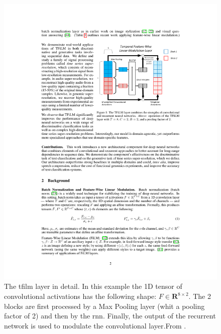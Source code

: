 \begin{figure}[H]                                   
	\begin{center}                                     
		\includegraphics[scale=1.5]{img/tfilm_layer.pdf}  
		\captionsetup{margin=2cm}                         
		\caption{The \gls{tfilm} layer in detail. In this example the 1D tensor of convolutional activations has the following shape: $F \in \mathbf{R}^{8 \times 2}$. The 2 blocks are first processed by a Max Pooling layer (whit a pooling factor of 2) and then by the \gls{rnn}. Finally, the output of the recurrent network is used to modulate the convolutional layer.From \cite{birnbaum2019temporal}.}
		\label{fig:tflim_layer}                           
	\end{center}                                       
\end{figure}                                        
